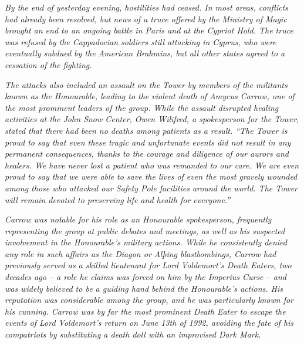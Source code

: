 \emph{By the end of yesterday evening, hostilities had ceased. In most
areas, conflicts had already been resolved, but news of a truce offered
by the Ministry of Magic brought an end to an ongoing battle in Paris
and at the Cypriot Hold. The truce was refused by the Cappadocian
soldiers still attacking in Cyprus, who were eventually subdued by the
American Brahmins, but all other states agreed to a cessation of the
fighting.}

\emph{The attacks also included an assault on the Tower by members of
the militants known as the Honourable, leading to the violent death of
Amycus Carrow, one of the most prominent leaders of the group. While the
assault disrupted healing activities at the John Snow Center, Owen
Wilifred, a spokesperson for the Tower, stated that there had been no
deaths among patients as a result. ``The Tower is proud to say that even
these tragic and unfortunate events did not result in any permanent
consequences, thanks to the courage and diligence of our aurors and
healers. We have never lost a patient who was remanded to our care. We
are even proud to say that we were able to save the lives of even the
most gravely wounded among those who attacked our Safety Pole facilities
around the world. The Tower will remain devoted to preserving life and
health for everyone.''}

\emph{Carrow was notable for his role as an Honourable spokesperson,
frequently representing the group at public debates and meetings, as
well as his suspected involvement in the Honourable's military actions.
While he consistently denied any role in such affairs as the Diagon or
Alþing blastbombings, Carrow had previously served as a skilled
lieutenant for Lord Voldemort's Death Eaters, two decades ago -- a role
he claims was forced on him by the Imperius Curse -- and was widely
believed to be a guiding hand behind the Honourable's actions. His
reputation was considerable among the group, and he was particularly
known for his cunning. Carrow was by far the most prominent Death Eater
to escape the events of Lord Voldemort's return on June 13th of 1992,
avoiding the fate of his compatriots by substituting a death doll with
an improvised Dark Mark.}

